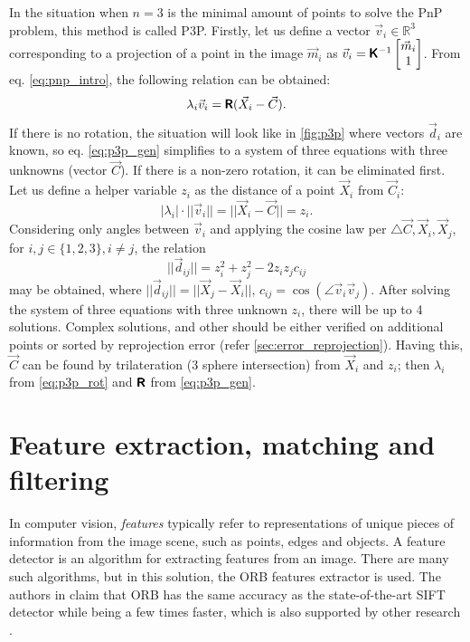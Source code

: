 In the situation when $n=3$ is the minimal amount of points to solve the PnP problem, this method is called P3P.  
Firstly, let us define a vector $\vec{v}_i \in \mathbb{R}^3$ corresponding to a projection of a point in the image $\vec{m}_i$ as $\vec{v}_i = \pmb{\mathsf{K}}^{-1}\begin{bmatrix}\vec{m}_i \\ 1 \end{bmatrix}$. From eq. \eqref{eq:pnp_intro}, the following relation can be obtained:
\begin{equation}
    \label{eq:p3p_gen}
    \lambda_i \vec{v}_i = \pmb{\mathsf{R}} (\vec{X}_i - \vec{C}).
\end{equation}
If there is no rotation, the situation will look like in \autoref{fig:p3p} where vectors $\vec{d}_i$ are known, so eq. \eqref{eq:p3p_gen} simplifies to a system of three equations with three unknowns (vector $\vec{C}$).
If there is a non-zero rotation, it can be eliminated first.
Let us define a helper variable $z_i$ as the distance of a point $\vec{X}_i$ from $\vec{C}_i$:
\begin{equation}
    \label{eq:p3p_rot}
    |\lambda_i| \cdot ||\vec{v}_i|| = || \vec{X}_i - \vec{C} || = z_i.
\end{equation}
Considering only angles between $\vec{v}_i$ and applying the cosine law per $\triangle{\vec{C}, \vec{X}_i, \vec{X}_j}$, for $i, j \in \{1, 2, 3\}, i \neq j$, the relation
\begin{equation}
    ||\vec{d}_{ij}|| = z_i^2 + z_j^2 - 2z_iz_jc_{ij}
\end{equation}
may be obtained, where $||\vec{d}_{ij}|| = || \vec{X}_j - \vec{X}_i ||$, $c_{ij} = \cos(\angle \vec{v}_i \vec{v}_j)$.
After solving the system of three equations with three unknown $z_i$, there will be up to 4 solutions.
Complex solutions, and other should be either verified on additional points \cite{Fischler1981} or sorted by reprojection error (refer \autoref{sec:error_reprojection}).
Having this, $\vec{C}$ can be found by trilateration (3 sphere intersection) from $\vec{X}_i$ and $z_i$; then $\lambda_i$ from \eqref{eq:p3p_rot} and $\pmb{\mathsf{R}}$ from \eqref{eq:p3p_gen}.

\section{Feature extraction, matching and filtering}
\label{sec:features}
In computer vision, \textit{features} typically refer to representations of unique pieces of information from the image scene, such as points, edges and objects.
A feature detector is an algorithm for extracting features from an image.
There are many such algorithms, but in this solution, the ORB features extractor is used. 
The authors in \cite{Rublee2011} claim that ORB has the same accuracy as the state-of-the-art SIFT detector while being a few times faster, which is also supported by other research \cite{Sharif2017}. 

